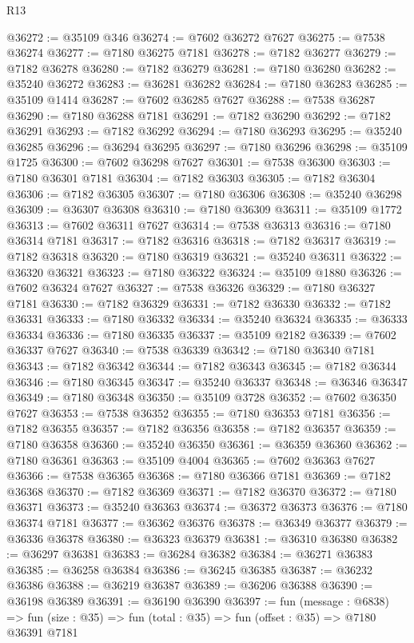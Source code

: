 \begin{lexlean}{R13}
\begin{coremodule}
@36272 := @35109 @346
@36274 := @7602 @36272 @7627
@36275 := @7538 @36274
@36277 := @7180 @36275 @7181
@36278 := @7182 @36277
@36279 := @7182 @36278
@36280 := @7182 @36279
@36281 := @7180 @36280
@36282 := @35240 @36272
@36283 := @36281 @36282
@36284 := @7180 @36283
@36285 := @35109 @1414
@36287 := @7602 @36285 @7627
@36288 := @7538 @36287
@36290 := @7180 @36288 @7181
@36291 := @7182 @36290
@36292 := @7182 @36291
@36293 := @7182 @36292
@36294 := @7180 @36293
@36295 := @35240 @36285
@36296 := @36294 @36295
@36297 := @7180 @36296
@36298 := @35109 @1725
@36300 := @7602 @36298 @7627
@36301 := @7538 @36300
@36303 := @7180 @36301 @7181
@36304 := @7182 @36303
@36305 := @7182 @36304
@36306 := @7182 @36305
@36307 := @7180 @36306
@36308 := @35240 @36298
@36309 := @36307 @36308
@36310 := @7180 @36309
@36311 := @35109 @1772
@36313 := @7602 @36311 @7627
@36314 := @7538 @36313
@36316 := @7180 @36314 @7181
@36317 := @7182 @36316
@36318 := @7182 @36317
@36319 := @7182 @36318
@36320 := @7180 @36319
@36321 := @35240 @36311
@36322 := @36320 @36321
@36323 := @7180 @36322
@36324 := @35109 @1880
@36326 := @7602 @36324 @7627
@36327 := @7538 @36326
@36329 := @7180 @36327 @7181
@36330 := @7182 @36329
@36331 := @7182 @36330
@36332 := @7182 @36331
@36333 := @7180 @36332
@36334 := @35240 @36324
@36335 := @36333 @36334
@36336 := @7180 @36335
@36337 := @35109 @2182
@36339 := @7602 @36337 @7627
@36340 := @7538 @36339
@36342 := @7180 @36340 @7181
@36343 := @7182 @36342
@36344 := @7182 @36343
@36345 := @7182 @36344
@36346 := @7180 @36345
@36347 := @35240 @36337
@36348 := @36346 @36347
@36349 := @7180 @36348
@36350 := @35109 @3728
@36352 := @7602 @36350 @7627
@36353 := @7538 @36352
@36355 := @7180 @36353 @7181
@36356 := @7182 @36355
@36357 := @7182 @36356
@36358 := @7182 @36357
@36359 := @7180 @36358
@36360 := @35240 @36350
@36361 := @36359 @36360
@36362 := @7180 @36361
@36363 := @35109 @4004
@36365 := @7602 @36363 @7627
@36366 := @7538 @36365
@36368 := @7180 @36366 @7181
@36369 := @7182 @36368
@36370 := @7182 @36369
@36371 := @7182 @36370
@36372 := @7180 @36371
@36373 := @35240 @36363
@36374 := @36372 @36373
@36376 := @7180 @36374 @7181
@36377 := @36362 @36376
@36378 := @36349 @36377
@36379 := @36336 @36378
@36380 := @36323 @36379
@36381 := @36310 @36380
@36382 := @36297 @36381
@36383 := @36284 @36382
@36384 := @36271 @36383
@36385 := @36258 @36384
@36386 := @36245 @36385
@36387 := @36232 @36386
@36388 := @36219 @36387
@36389 := @36206 @36388
@36390 := @36198 @36389
@36391 := @36190 @36390
@36397 := fun (message : @6838) =>
  fun (size : @35) => fun (total : @35) => fun (offset : @35) => @7180 @36391 @7181

\end{coremodule}
\end{lexlean}
